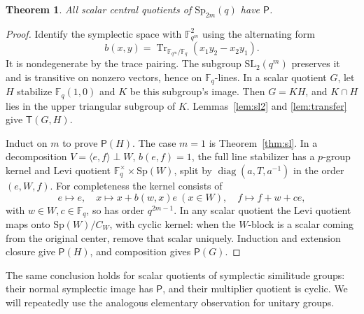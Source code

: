 \documentclass[11pt]{article}
\newtheorem{theorem}{Theorem}[section]
\theoremstyle{definition}
\newcommand{\F}{\mathbb F}
\newcommand{\Pp}{\mathsf P}
\newcommand{\Tt}{\mathsf T}
\newcommand{\SL}{\mathrm{SL}}
\newcommand{\Sp}{\mathrm{Sp}}
\newcommand{\Tr}{\operatorname{Tr}}
\newcommand{\diag}{\operatorname{diag}}
\begin{document}
\begin{theorem}\label{thm:sp}
All scalar central quotients of $\Sp_{2m}(q)$ have $\Pp$.
\end{theorem}
\begin{proof}
Identify the symplectic space with $\F_{q^m}^2$ using the alternating form
\[
b(x,y)=\Tr_{\F_{q^m}/\F_q}(x_1y_2-x_2y_1).
\]
It is nondegenerate by the trace pairing. The subgroup $\SL_2(q^m)$ preserves it and is transitive on nonzero vectors, hence on $\F_q$-lines. In a scalar quotient $G$, let $H$ stabilize $\F_q(1,0)$ and $K$ be this subgroup's image. Then $G=KH$, and $K\cap H$ lies in the upper triangular subgroup of $K$. Lemmas~\ref{lem:sl2} and \ref{lem:transfer} give $\Tt(G,H)$.

Induct on $m$ to prove $\Pp(H)$. The case $m=1$ is Theorem~\ref{thm:sl}. In a decomposition $V=\langle e,f\rangle\perp W$, $b(e,f)=1$, the full line stabilizer has a $p$-group kernel and Levi quotient $\F_q^{\times}\times\Sp(W)$, split by $\diag(a,T,a^{-1})$ in the order $(e,W,f)$. For completeness the kernel consists of
\[
e\mapsto e,\quad x\mapsto x+b(w,x)e\ (x\in W),\quad f\mapsto f+w+ce,
\]
with $w\in W,c\in\F_q$, so has order $q^{2m-1}$. In any scalar quotient the Levi quotient maps onto $\Sp(W)/C_W$, with cyclic kernel: when the $W$-block is a scalar coming from the original center, remove that scalar uniquely. Induction and extension closure give $\Pp(H)$, and composition gives $\Pp(G)$.
\end{proof}
The same conclusion holds for scalar quotients of symplectic similitude groups: their normal symplectic image has $\Pp$, and their multiplier quotient is cyclic. We will repeatedly use the analogous elementary observation for unitary groups.
\end{document}
